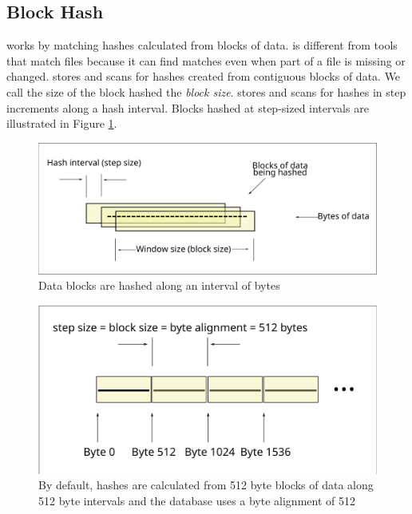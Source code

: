 \documentclass[11pt,fleqn]{article} %
\begin{document}
\subsection{Block Hash}
\hdb works by matching hashes calculated from blocks of data.  \hdb is different from tools that match files because it can find matches even when part of a file is missing or changed.  \hdb stores and scans for hashes created from contiguous blocks of data.  We call the size of the block hashed the \textit{block size}.  \hdb stores and scans for hashes in step increments along a hash interval. Blocks hashed at step-sized intervals are illustrated in Figure \ref{fig:hashInterval}.\\

\begin{figure}
	\center
	\includegraphics[scale=.45]{drawings/hash_interval}
	\caption{Data blocks are hashed along an interval of bytes}
	\label{fig:hashInterval}
\end{figure}

\begin{figure}
	\center
	\includegraphics[scale=.45]{drawings/default_hash_interval}
	\caption{By default, hashes are calculated from 512 byte blocks of data along 512 byte intervals and the database uses a byte alignment of 512}
	\label{fig:defaultHashInterval}
\end{figure}
\end{document}

